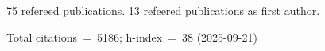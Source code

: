 75 refereed publications. 13 refeered publications as first author.

Total citations~=~5186; h-index~=~38 (2025-09-21)